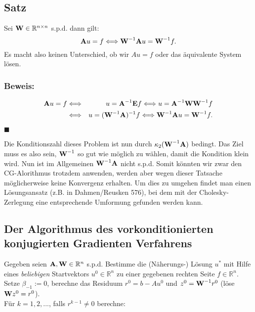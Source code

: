 \subsection{Satz}

Sei ${\textbf{W}} \in \mathbb{R}^{n \times n}$ s.p.d. dann gilt:
\begin{equation}
{\textbf{A}}u = f \Longleftrightarrow {\textbf{W}}^{-1} {\textbf{A}} u = {\textbf{W}}^{-1} f.
\end{equation}
Es macht also keinen Unterschied, ob wir $Au = f$ oder das äquivalente System lösen.

\subsubsection{Beweis:}

\begin{eqnarray}
{\textbf{A}}u = f &\Longleftrightarrow& u = {\textbf{A}}^{-1} {\textbf{E}} f \Longleftrightarrow u = {\textbf{A}}^{-1} {\textbf{W}} {\textbf{W}}^{-1} f \notag \\
&\Longleftrightarrow& u = ({\textbf{W}}^{-1} {\textbf{A}})^{-1} f \Longleftrightarrow {\textbf{W}}^{-1} {\textbf{A}} u = {\textbf{W}}^{-1} f. \notag
\end{eqnarray}
\begin{flushright}
$\blacksquare$
\end{flushright}

Die Konditionszahl dieses Problem ist nun durch $\kappa_{2}({\textbf{W}}^{-1}{\textbf{A}})$ bedingt. Das Ziel muss es also sein, ${\textbf{W}}^{-1}$ so gut wie möglich zu wählen, damit die Kondition klein wird. Nun ist im Allgemeinen ${\textbf{W}}^{-1}{\textbf{A}}$ nicht s.p.d. Somit könnten wir zwar den CG-Alorithmus trotzdem anwenden, werden aber wegen dieser Tatsache möglicherweise keine Konvergenz erhalten. Um dies zu umgehen findet man einen Lösungsansatz (z.B. in Dahmen/Reusken 576), bei dem mit der Cholesky-Zerlegung eine entsprechende Umformung gefunden werden kann.

\subsection{Der Algorithmus des vorkonditionierten konjugierten Gradienten Verfahrens}\label{ss.Algorithmus PCG}

Gegeben seien ${\textbf{A}}, {\textbf{W}} \in \mathbb{R}^{n}$ s.p.d. Bestimme die (Näherungs-) Lösung $u^{*}$ mit Hilfe eines \textit{beliebigen} Startvektors $u^{0} \in \mathbb{R}^{n}$ zu einer gegebenen rechten Seite $f \in \mathbb{R}^{n}$. Setze $\beta_{-1} := 0$, berechne das Residuum $r^{0} = b - Au^{0}$ und $z^{0} = {\textbf{W}}^{-1}r^{0}$ (löse ${\textbf{W}}z^{0} = r^{0}$).\\
Für $k = 1,2,...$, falls $r^{k-1} \ne 0$ berechne:

